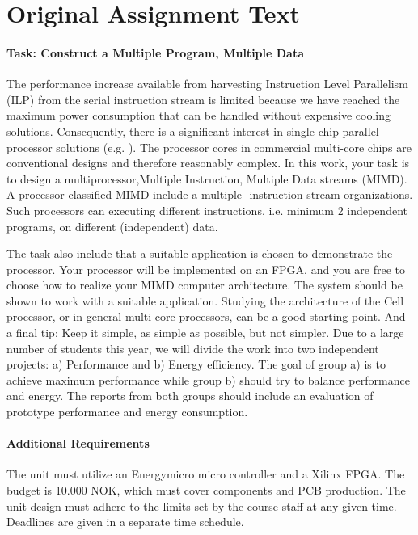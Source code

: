 \section{Original Assignment Text}\label{intro:original-text}
\paragraph{Task: Construct a Multiple Program, Multiple Data}
The performance increase available from harvesting Instruction Level Parallelism
(ILP) from the serial instruction stream is limited because we have reached the
maximum power consumption that can be handled without expensive cooling
solutions\cite{olukotun}. Consequently, there is a significant interest in single-chip
parallel processor solutions (e.g. \cite{bell,kongetira}). The processor cores in commercial
multi-core chips are conventional designs and therefore reasonably complex. In
this work, your task is to design a multiprocessor,Multiple Instruction,
Multiple Data streams (MIMD). A processor classified MIMD include a multiple-
instruction stream organizations\cite{flynn}. Such processors can executing different
instructions, i.e. minimum 2 independent programs, on different (independent)
data.

The task also include that a suitable application is chosen to demonstrate the
processor. Your processor will be implemented on an FPGA, and you are free to
choose how to realize your MIMD computer architecture. The system should be
shown to work with a suitable application. Studying the architecture of the
Cell processor\cite{wiki_cell_mpu}, or in general multi-core processors\cite{wiki_multicore}, can be a good
starting point. And a final tip; Keep it simple, as simple as possible, but not
simpler. Due to a large number of students this year, we will divide the work
into two independent projects: a) Performance and b) Energy efficiency. The goal
of group a) is to achieve maximum performance while group b) should try to
balance performance and energy. The reports from both groups should include an
evaluation of prototype performance and energy consumption.

\paragraph{Additional Requirements}
The unit must utilize an Energymicro micro controller and a Xilinx FPGA. The
budget is 10.000 NOK, which must cover components and PCB production. The unit
design must adhere to the limits set by the course staff at any given time.
Deadlines are given in a separate time schedule.

